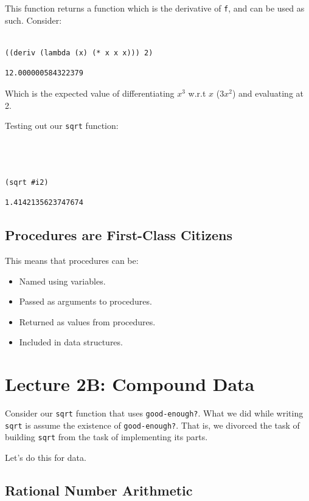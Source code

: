 \documentclass[9pt]{report}
\begin{document}
This function returns a function which is the derivative of \texttt{f},
and can be used as such. Consider:

\begin{verbatim}

((deriv (lambda (x) (* x x x))) 2)
\end{verbatim}

\begin{verbatim}
12.000000584322379
\end{verbatim}


Which is the expected value of differentiating \(x^{3}\) w.r.t \(x\)
(\(3x^2\)) and evaluating at 2.

Testing out our \texttt{sqrt} function:

\begin{verbatim}



(sqrt #i2)
\end{verbatim}

\begin{verbatim}
1.4142135623747674
\end{verbatim}

\section{Procedures are First-Class Citizens}
\label{sec:org8a23c8e}

This means that procedures can be:
\begin{itemize}
\item Named using variables.
\item Passed as arguments to procedures.
\item Returned as values from procedures.
\item Included in data structures.
\end{itemize}

\chapter{Lecture 2B: Compound Data}
\label{sec:orgb8d3cb2}

Consider our \texttt{sqrt} function that uses \texttt{good-enough?}. What we did
while writing \texttt{sqrt} is assume the existence of \texttt{good-enough?}.
That is, we divorced the task of building \texttt{sqrt} from the task of
implementing its parts.

Let's do this for data.

\section{Rational Number Arithmetic}
\label{sec:orgad300f5}
\end{document}
